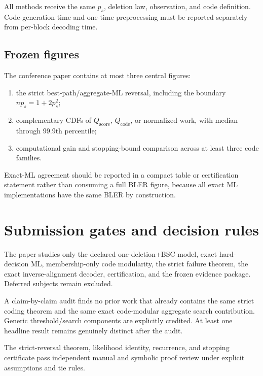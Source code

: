 \documentclass[11pt]{article}
\theoremstyle{definition}
\theoremstyle{remark}
\begin{document}
All methods receive the same $p_s$, deletion law, observation, and code definition. Code-generation time and one-time preprocessing must be reported separately from per-block decoding time.

\subsection{Frozen figures}

The conference paper contains at most three central figures:
\begin{enumerate}
  \item the strict best-path/aggregate-ML reversal, including the boundary $np_s=1+2p_s^2$;
  \item complementary CDFs of $Q_{\mathrm{score}}$, $Q_{\mathrm{code}}$, or normalized work, with median through 99.9th percentile;
  \item computational gain and stopping-bound comparison across at least three code families.
\end{enumerate}

Exact-ML agreement should be reported in a compact table or certification statement rather than consuming a full BLER figure, because all exact ML implementations have the same BLER by construction.

\section{Submission gates and decision rules}
\label{sec:gates}

\begin{gatebox}
The paper studies only the declared one-deletion+BSC model, exact hard-decision ML, membership-only code modularity, the strict failure theorem, the exact inverse-alignment decoder, certification, and the frozen evidence package. Deferred subjects remain excluded.
\end{gatebox}

\begin{gatebox}
A claim-by-claim audit finds no prior work that already contains the same strict coding theorem and the same exact code-modular aggregate search contribution. Generic threshold/search components are explicitly credited. At least one headline result remains genuinely distinct after the audit.
\end{gatebox}

\begin{gatebox}
The strict-reversal theorem, likelihood identity, recurrence, and stopping certificate pass independent manual and symbolic proof review under explicit assumptions and tie rules.
\end{gatebox}
\end{document}

